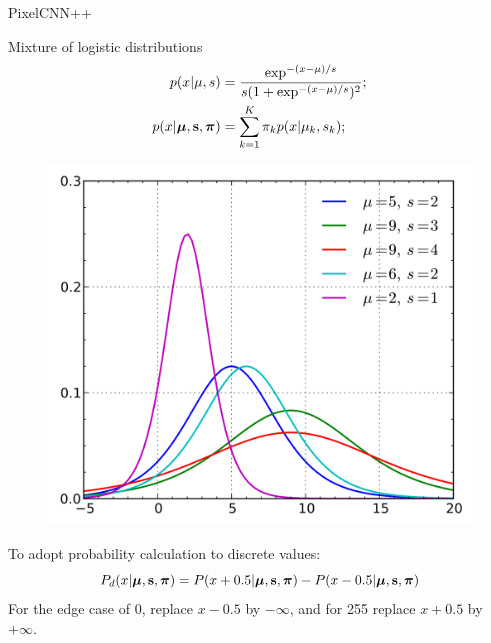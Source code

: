 \begin{frame}{PixelCNN++}
	\begin{minipage}[t]{0.55\columnwidth}
		\begin{block}{Mixture of logistic distributions}
			\begin{align*}
				p(x | \mu, s) &= \frac{\exp^{-(x - \mu) / s}}{s (1 + \exp^{-(x - \mu) / s})^2}; \\
				p(x | \boldsymbol{\mu}, \mathbf{s}, \boldsymbol{\pi}) &= \sum_{k=1}^K \pi_k p(x | \mu_k, s_k);
			\end{align*}
		\end{block}
	\end{minipage}%
	\begin{minipage}[t]{0.45\columnwidth}
		\begin{figure}
			\includegraphics[width=\linewidth]{figs/picelcnn++logistic}
		\end{figure}
	\end{minipage}
	To adopt probability calculation to discrete values:
	\[
	P_d(x | \boldsymbol{\mu}, \mathbf{s}, \boldsymbol{\pi}) = P(x + 0.5 | \boldsymbol{\mu}, \mathbf{s}, \boldsymbol{\pi}) - P(x - 0.5 | \boldsymbol{\mu}, \mathbf{s}, \boldsymbol{\pi})
	\]
	For the edge case of 0, replace $x - 0.5$ by $-\infty$, and for 255 replace $x + 0.5$ by $+\infty$.
\end{frame}
